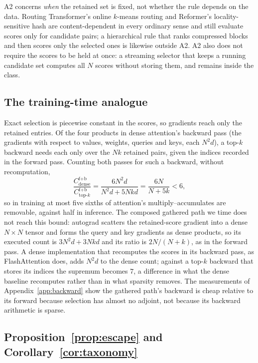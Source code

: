 A2 concerns \emph{when} the retained set is fixed, not whether the rule depends
on the data. Routing Transformer's online $k$-means routing
\citep{roy2021routing} and Reformer's locality-sensitive hash
\citep{kitaev2020reformer} are content-dependent in every ordinary sense and
still evaluate scores only for candidate pairs; a hierarchical rule that ranks
compressed blocks and then scores only the selected ones \citep{yuan2025nsa} is
likewise outside A2. A2 also does not require the scores to be held at once: a
streaming selector that keeps a running candidate set computes all $N$ scores
without storing them, and remains inside the class.

\subsection{The training-time analogue}

Exact selection is piecewise constant in the scores, so gradients reach only
the retained entries. Of the four products in dense attention's backward pass
(the gradients with respect to values, weights, queries and keys, each
$N^2 d$), a top-$k$ backward needs each only over the $Nk$ retained pairs,
given the indices recorded in the forward pass. Counting both passes for such a
backward, without recomputation,
\begin{equation}
\frac{C^{\text{f+b}}_{\text{dense}}}{C^{\text{f+b}}_{\text{top-}k}}
= \frac{6N^2 d}{N^2 d + 5Nkd} = \frac{6N}{N+5k} < 6,
\end{equation}
so in training at most five sixths of attention's multiply--accumulates are
removable, against half in inference. The composed gathered path we time does
not reach this bound: autograd scatters the retained-score gradient into a dense
$N \times N$ tensor and forms the query and key gradients as dense products, so
its executed count is $3N^2d + 3Nkd$ and its ratio is $2N/(N+k)$, as in the
forward pass. A dense implementation that recomputes the scores in its backward
pass, as FlashAttention does, adds $N^2 d$ to the dense count; against a top-$k$
backward that stores its indices the supremum becomes $7$, a difference in what
the dense baseline recomputes rather than in what sparsity removes. The
measurements of Appendix~\ref{app:backward} show the gathered path's backward is
cheap relative to its forward because selection has almost no adjoint, not
because its backward arithmetic is sparse.

\subsection{Proposition~\ref{prop:escape} and Corollary~\ref{cor:taxonomy}}

